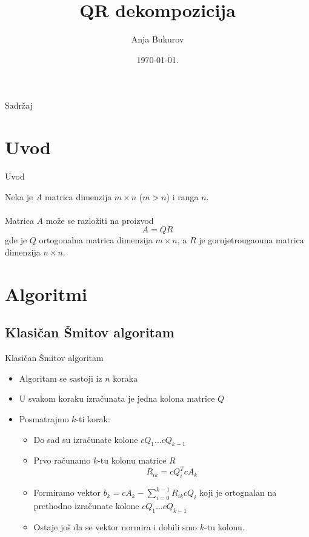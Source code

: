 \documentclass[serbian]{beamer}
\title[QR dekompozicija]{QR dekompozicija}
\author{Anja Bukurov}
\institute{Matematički fakultet, \\ Univerzitet u Beogradu}
\date{\today.}
\begin{document}
\begin{frame}
  	\titlepage
\end{frame}

\begin{frame}{Sadržaj}
  	\tableofcontents
\end{frame}

\section{Uvod}

\begin{frame}{Uvod}

	Neka je $A$ matrica dimenzija $m\times n$ ($m > n$) i ranga $n$.
	\\ ~
	\\
	Matrica $A$ može se razložiti na proizvod
	$$A = QR$$
	gde je $Q$ ortogonalna matrica dimenzija $m \times n$, a $R$ je gornjetrougaouna matrica dimenzija $n \times n$.
	
\end{frame}

\section{Algoritmi}

\subsection{Klasičan Šmitov algoritam}
\begin{frame}{Klasičan Šmitov algoritam}

\begin{itemize}
	\item Algoritam se sastoji iz $n$ koraka
	\item U svakom koraku izračunata je jedna kolona matrice $Q$
	\item Posmatrajmo $k$-ti korak:
	\begin{itemize}
		\item Do sad su izračunate kolone $cQ_1 \ldots cQ_{k-1}$
		\item Prvo računamo $k$-tu kolonu matrice $R$ 
		$$R_{ik} = cQ_i^TcA_k$$
		\item Formiramo vektor $b_k = cA_k − \sum_{i=0}^{k-1}R_{ik}cQ_i$ koji je ortognalan na prethodno izračunate kolone $cQ_1 \ldots cQ_{k-1}$
		\item Ostaje još da se vektor normira i dobili smo $k$-tu kolonu.
	\end{itemize}
\end{itemize}

\end{frame}
\end{document}
